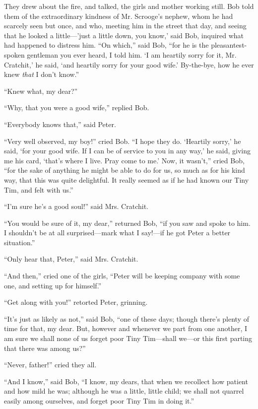 \documentclass[paper=a5,BCOR=15mm,twoside,DIV=15,headinclude=off,12pt,chapterprefix=off,openany,headings=huge]{scrbook} %
\begin{document}
They drew about the fire, and talked, the girls and mother working still. Bob told them of the extraordinary kindness of Mr. Scrooge's nephew, whom he had scarcely seen but once, and who, meeting him in the street that day, and seeing that he looked a little—'just a little down, you know,' said Bob, inquired what had happened to distress him. \enquote{On which,} said Bob, \enquote{for he is the pleasantest-spoken gentleman you ever heard, I told him. \enquote{I am heartily sorry for it, Mr. Cratchit,} he said, \enquote{and heartily sorry for your good wife.} By-the-bye, how he ever knew \textit{that} I don't know.}

\enquote{Knew what, my dear?}

\enquote{Why, that you were a good wife,} replied Bob.

\enquote{Everybody knows that,} said Peter.

\enquote{Very well observed, my boy!} cried Bob. \enquote{I hope they do. \enquote{Heartily sorry,} he said, \enquote{for your good wife. If I can be of service to you in any way,} he said, giving me his card, \enquote{that's where I live. Pray come to me.} Now, it wasn't,} cried Bob, \enquote{for the sake of anything he might be able to do for us, so much as for his kind way, that this was quite delightful. It really seemed as if he had known our Tiny Tim, and felt with us.}

\enquote{I'm sure he's a good soul!} said Mrs. Cratchit.

\enquote{You would be sure of it, my dear,} returned Bob, \enquote{if you saw and spoke to him. I shouldn't be at all surprised—mark what I say!—if he got Peter a better situation.}

\enquote{Only hear that, Peter,} said Mrs. Cratchit.

\enquote{And then,} cried one of the girls, \enquote{Peter will be keeping company with some one, and setting up for himself.}

\enquote{Get along with you!} retorted Peter, grinning.

\enquote{It's just as likely as not,} said Bob, \enquote{one of these days; though there's plenty of time for that, my dear. But, however and whenever we part from one another, I am sure we shall none of us forget poor Tiny Tim—shall we—or this first parting that there was among us?}

\enquote{Never, father!} cried they all.

\enquote{And I know,} said Bob, \enquote{I know, my dears, that when we recollect how patient and how mild he was; although he was a little, little child; we shall not quarrel easily among ourselves, and forget poor Tiny Tim in doing it.}
\end{document}
